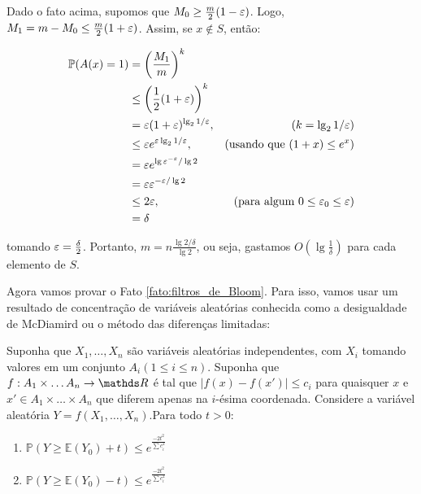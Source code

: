 Dado o fato acima, supomos que $M_{0} \geq \frac{m}{2}(1-\varepsilon)$. Logo,
$M_{1}=m-M_{0} \leq \frac{m}{2}(1+\varepsilon)$. Assim, se $x \notin S$, então:

\begin{align*}
  \mathbb{P}(A(x)=1)&= \left(\frac{M_{1}}{m}\right)^k \\
                    &\leq \left(\frac{1}{2}(1+\varepsilon)\right)^k \\
                    &= \varepsilon(1+\varepsilon)^{\lg_{2}1/\varepsilon}, & \left(k=\lg_{2}1/\varepsilon\right)\\
                    &\leq \varepsilon e^{\varepsilon\lg_{2}1/\varepsilon}, & \left(\text{usando que } (1+x) \leq e^{x}\right)\\
                    &= \varepsilon e^{\lg\varepsilon^{-\varepsilon}/\lg 2}\\
                    &= \varepsilon \varepsilon^{-\varepsilon/\lg 2}\\
                    &\leq 2 \varepsilon, & \left(\text{para algum } 0 \leq \varepsilon_{0} \leq \varepsilon\right)\\
                    &= \delta
\end{align*}

tomando $\varepsilon=\frac{\delta}{2}$. Portanto,
$m=n\frac{\lg 2/\delta}{\lg 2}$, ou seja, gastamos
$O(\lg \frac{1}{\delta})$ para cada elemento de $S$.

Agora vamos provar o Fato \ref{fato:filtros_de_Bloom}. Para isso,
vamos usar um resultado de concentração de variáveis aleatórias
conhecida como a desigualdade de McDiamird ou o método das diferenças
limitadas:

\begin{lema}
\label{lema:McDiamird}
Suponha que $X_{1},\dots,X_{n}$ são variáveis aleatórias
independentes, com $X_{i}$ tomando valores em um conjunto $A_{i}(1
\leq i \leq n)$. Suponha que $f: A_{1}\times \dots A_{n} \rightarrow
\RR$ é tal que $|f(x)-f(x')|\leq c_{i}$ para quaisquer $x$ e $x' \in
A_{1}\times \dots \times A_{n}$ que diferem apenas na $i$-ésima
coordenada. Considere a variável aleatória
$Y=f(X_{1},\dots,X_{n})$.Para todo $t > 0$:

  \begin{enumerate}
    \item $\mathbb{P}(Y \geq \mathbb{E}(Y_0)+t) \leq e^{\frac{-2t^{2}}{\sum c_{i}^{2}}}$
    \item $\mathbb{P}(Y \geq \mathbb{E}(Y_0)-t) \leq e^{\frac{-2t^{2}}{\sum c_{i}^{2}}}$
    \end{enumerate}
\end{lema}

